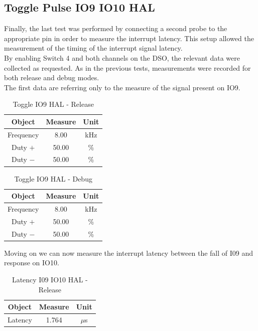 \documentclass[../main.tex]{subfiles}
\begin{document}
\subsection{Toggle Pulse IO9 IO10 HAL}

Finally, the last test was performed by connecting a second probe to the appropriate pin in order to measure the interrupt latency. This setup allowed the measurement of the timing of the interrupt signal latency.\\

By enabling Switch 4 and both channels on the DSO, the relevant data were collected as requested. As in the previous tests, measurements were recorded for both release and debug modes.\\

The first data are referring only to the measure of the signal present on IO9.

\begin{table}[h]
\centering
\begin{tabular}{ccc}

\textbf{Object} & \textbf{Measure} & \textbf{Unit} \\
\hline
Frequency & 8.00 & kHz \\
\hline
Duty $+$ & 50.00 & \% \\
\hline
Duty $-$ & 50.00 & \% \\

\end{tabular}
\caption{Toggle IO9 HAL - Release}
\label{tab:example}
\end{table}

\begin{table}[h]
\centering
\begin{tabular}{ccc}

\textbf{Object} & \textbf{Measure} & \textbf{Unit} \\
\hline
Frequency & 8.00 & kHz \\
\hline
Duty $+$ & 50.00 & \% \\
\hline
Duty $-$ & 50.00 & \% \\

\end{tabular}
\caption{Toggle IO9 HAL  - Debug}
\label{tab:example}
\end{table}

Moving on we can now measure the interrupt latency between the fall of I09 and response on IO10.


\begin{table}[h!]
\centering
\begin{tabular}{ccc}

\textbf{Object} & \textbf{Measure} & \textbf{Unit} \\
\hline
Latency & 1.764 & $\mu$s \\

\end{tabular}
\caption{Latency I09 IO10 HAL - Release}
\label{tab:example}
\end{table}
\end{document}
